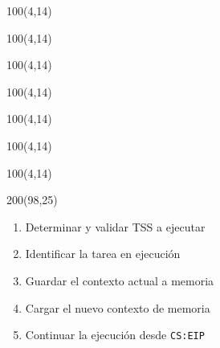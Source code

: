 \documentclass[aspectratio=169]{beamer}
\begin{document}
\begin{frame}
    \begin{textblock}{100}(4,14)  \end{textblock}  %
    \begin{textblock}{100}(4,14)  \end{textblock} %
    \begin{textblock}{100}(4,14)  \end{textblock}  %
    \begin{textblock}{100}(4,14)  \end{textblock} %
    \begin{textblock}{100}(4,14)  \end{textblock} %
    
    \begin{textblock}{100}(4,14)  \end{textblock} %
    \begin{textblock}{100}(4,14)  \end{textblock} %
    
    \begin{textblock}{200}(98,25)
    \small 
    \begin{enumerate}
    \item<5->  Determinar y validar TSS a ejecutar
    \item<8->  Identificar la tarea en ejecución
    \item<10->  Guardar el contexto actual a memoria
    \item<12-> Cargar el nuevo contexto de memoria
    \item<15-> Continuar la ejecución desde \texttt{CS:EIP}
    \end{enumerate}
    \end{textblock}
\end{frame}
\end{document}
